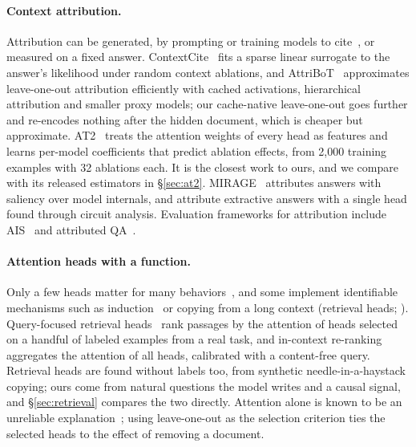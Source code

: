 \documentclass[11pt]{article}
\begin{document}
\paragraph{Context attribution.} Attribution can be generated, by prompting or training models to cite~\citep{gao2023alce,zhang2024longcite}, or measured on a fixed answer. ContextCite~\citep{cohenwang2024contextcite} fits a sparse linear surrogate to the answer's likelihood under random context ablations, and AttriBoT~\citep{liu2025attribot} approximates leave-one-out attribution efficiently with cached activations, hierarchical attribution and smaller proxy models; our cache-native leave-one-out goes further and re-encodes nothing after the hidden document, which is cheaper but approximate. AT2~\citep{cohenwang2025at2} treats the attention weights of every head as features and learns per-model coefficients that predict ablation effects, from 2{,}000 training examples with 32 ablations each. It is the closest work to ours, and we compare with its released estimators in \S\ref{sec:at2}. MIRAGE~\citep{qi2024mirage} attributes answers with saliency over model internals, and \citet{basu2025circuits} attribute extractive answers with a single head found through circuit analysis. Evaluation frameworks for attribution include AIS~\citep{rashkin2023ais} and attributed QA~\citep{bohnet2022aqa}.

\paragraph{Attention heads with a function.} Only a few heads matter for many behaviors~\citep{voita2019heads,michel2019sixteen}, and some implement identifiable mechanisms such as induction~\citep{olsson2022induction} or copying from a long context (retrieval heads; \citealp{wu2024retrievalhead}). Query-focused retrieval heads~\citep{zhang2025qrhead} rank passages by the attention of heads selected on a handful of labeled examples from a real task, and in-context re-ranking~\citep{chen2025icr} aggregates the attention of all heads, calibrated with a content-free query. Retrieval heads are found without labels too, from synthetic needle-in-a-haystack copying; ours come from natural questions the model writes and a causal signal, and \S\ref{sec:retrieval} compares the two directly. Attention alone is known to be an unreliable explanation~\citep{jain2019attention,wiegreffe2019attention}; using leave-one-out as the selection criterion ties the selected heads to the effect of removing a document.
\end{document}
